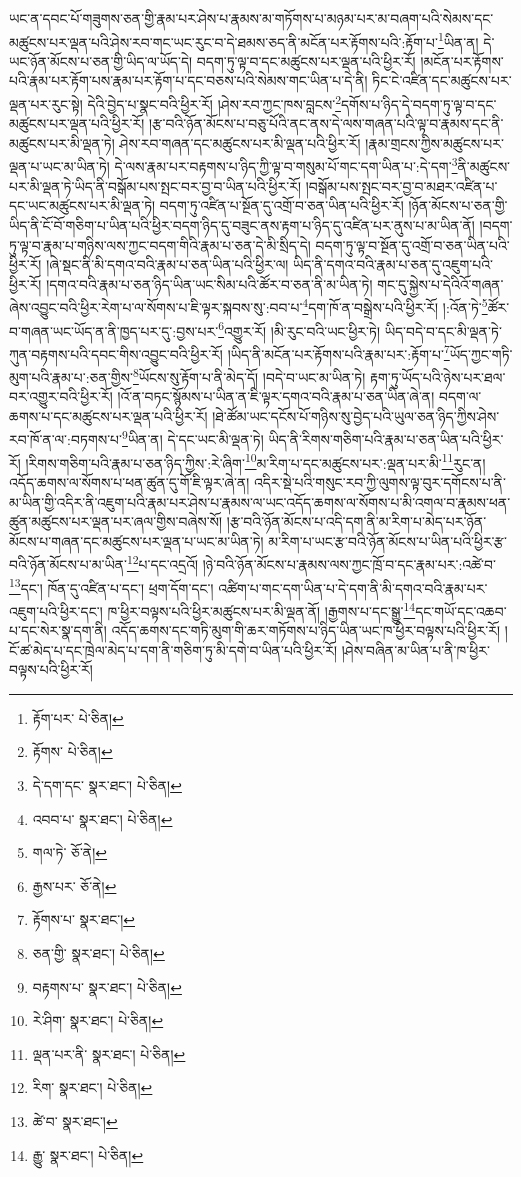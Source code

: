ཡང་ན་དབང་པོ་གཟུགས་ཅན་གྱི་རྣམ་པར་ཤེས་པ་རྣམས་མ་གཏོགས་པ་མཉམ་པར་མ་བཞག་པའི་སེམས་དང་མཚུངས་པར་ལྡན་པའི་ཤེས་རབ་གང་ཡང་རུང་བ་དེ་ཐམས་ཅད་ནི་མངོན་པར་རྟོགས་པའི་:རྟོག་པ་\footnote{རྟོག་པར་  པེ་ཅིན། }ཡིན་ན། དེ་ཡང་ཉོན་མོངས་པ་ཅན་གྱི་ཡིད་ལ་ཡོད་དེ། བདག་ཏུ་ལྟ་བ་དང་མཚུངས་པར་ལྡན་པའི་ཕྱིར་རོ། །མངོན་པར་རྟོགས་པའི་རྣམ་པར་རྟོག་པས་རྣམ་པར་རྟོག་པ་དང་བཅས་པའི་སེམས་གང་ཡིན་པ་དེ་ནི། ཏིང་ངེ་འཛིན་དང་མཚུངས་པར་ལྡན་པར་རུང་སྟེ། དེའི་བྱེད་པ་སྣང་བའི་ཕྱིར་རོ། །ཤེས་རབ་ཀྱང་ཁས་བླངས་\footnote{རྟོགས་  པེ་ཅིན། }དགོས་པ་ཉིད་དེ་བདག་ཏུ་ལྟ་བ་དང་མཚུངས་པར་ལྡན་པའི་ཕྱིར་རོ། །རྩ་བའི་ཉོན་མོངས་པ་བཅུ་པོའི་ནང་ནས་དེ་ལས་གཞན་པའི་ལྟ་བ་རྣམས་དང་ནི་མཚུངས་པར་མི་ལྡན་ཏེ། ཤེས་རབ་གཞན་དང་མཚུངས་པར་མི་ལྡན་པའི་ཕྱིར་རོ། །རྣམ་གྲངས་ཀྱིས་མཚུངས་པར་ལྡན་པ་ཡང་མ་ཡིན་ཏེ། དེ་ལས་རྣམ་པར་བརྟགས་པ་ཉིད་ཀྱི་ལྟ་བ་གསུམ་པོ་གང་དག་ཡིན་པ་:དེ་དག་\footnote{དེ་དག་དང་  སྣར་ཐང་།  པེ་ཅིན། }ནི་མཚུངས་པར་མི་ལྡན་ཏེ་ཡིད་ནི་བསྒོམ་པས་སྤང་བར་བྱ་བ་ཡིན་པའི་ཕྱིར་རོ། །བསྒོམ་པས་སྤང་བར་བྱ་བ་མཐར་འཛིན་པ་དང་ཡང་མཚུངས་པར་མི་ལྡན་ཏེ། བདག་ཏུ་འཛིན་པ་སྔོན་དུ་འགྲོ་བ་ཅན་ཡིན་པའི་ཕྱིར་རོ། །ཉོན་མོངས་པ་ཅན་གྱི་ཡིད་ནི་ངོ་བོ་གཅིག་པ་ཡིན་པའི་ཕྱིར་བདག་ཉིད་དུ་བཟུང་ནས་རྟག་པ་ཉིད་དུ་འཛིན་པར་ནུས་པ་མ་ཡིན་ནོ། །བདག་ཏུ་ལྟ་བ་རྣམ་པ་གཉིས་ལས་ཀྱང་བདག་གིའི་རྣམ་པ་ཅན་དེ་མི་སྲིད་དེ། བདག་ཏུ་ལྟ་བ་སྔོན་དུ་འགྲོ་བ་ཅན་ཡིན་པའི་ཕྱིར་རོ། །ཞེ་སྡང་ནི་མི་དགའ་བའི་རྣམ་པ་ཅན་ཡིན་པའི་ཕྱིར་ལ། ཡིད་ནི་དགའ་བའི་རྣམ་པ་ཅན་དུ་འཇུག་པའི་ཕྱིར་རོ། །དགའ་བའི་རྣམ་པ་ཅན་ཉིད་ཡིན་ཡང་སིམ་པའི་ཚོར་བ་ཅན་ནི་མ་ཡིན་ཏེ། གང་དུ་སྐྱེས་པ་དེའིའོ་གཞན་ཞེས་འབྱུང་བའི་ཕྱིར་རེག་པ་ལ་སོགས་པ་ཇི་ལྟར་སྐབས་སུ་:བབ་པ་\footnote{འབབ་པ་  སྣར་ཐང་།  པེ་ཅིན། }དག་ཁོ་ན་བསྒྲེས་པའི་ཕྱིར་རོ། །:འོན་ཏེ་\footnote{གལ་ཏེ་  ཅོ་ནེ། }ཚོར་བ་གཞན་ཡང་ཡོད་ན་ནི་ཁྱད་པར་དུ་:བྱས་པར་\footnote{རྒྱས་པར་  ཅོ་ནེ། }འགྱུར་རོ། །མི་རུང་བའི་ཡང་ཕྱིར་ཏེ། ཡིད་བདེ་བ་དང་མི་ལྡན་ཏེ་ཀུན་བརྟགས་པའི་དབང་གིས་འབྱུང་བའི་ཕྱིར་རོ། །ཡིད་ནི་མངོན་པར་རྟོགས་པའི་རྣམ་པར་:རྟོག་པ་\footnote{རྟོགས་པ་  སྣར་ཐང་། }ཡོད་ཀྱང་གཏི་མུག་པའི་རྣམ་པ་:ཅན་གྱིས་\footnote{ཅན་གྱི་  སྣར་ཐང་།  པེ་ཅིན། }ཡོངས་སུ་རྟོག་པ་ནི་མེད་དོ། །བདེ་བ་ཡང་མ་ཡིན་ཏེ། རྟག་ཏུ་ཡོད་པའི་ཉེས་པར་ཐལ་བར་འགྱུར་བའི་ཕྱིར་རོ། །འོ་ན་བཏང་སྙོམས་པ་ཡིན་ན་ཇི་ལྟར་དགའ་བའི་རྣམ་པ་ཅན་ཡིན་ཞེ་ན། བདག་ལ་ཆགས་པ་དང་མཚུངས་པར་ལྡན་པའི་ཕྱིར་རོ། །ཐེ་ཚོམ་ཡང་དངོས་པོ་གཉིས་སུ་བྱེད་པའི་ཡུལ་ཅན་ཉིད་ཀྱིས་ཤེས་རབ་ཁོ་ན་ལ་:བཏགས་པ་\footnote{བརྟགས་པ་  སྣར་ཐང་།  པེ་ཅིན། }ཡིན་ན། དེ་དང་ཡང་མི་ལྡན་ཏེ། ཡིད་ནི་རིགས་གཅིག་པའི་རྣམ་པ་ཅན་ཡིན་པའི་ཕྱིར་རོ། །རིགས་གཅིག་པའི་རྣམ་པ་ཅན་ཉིད་ཀྱིས་:རེ་ཞིག་\footnote{རེ་ཤིག་  སྣར་ཐང་།  པེ་ཅིན། }མ་རིག་པ་དང་མཚུངས་པར་:ལྡན་པར་མི་\footnote{ལྡན་པར་ནི་  སྣར་ཐང་།  པེ་ཅིན། }རུང་ན། འདོད་ཆགས་ལ་སོགས་པ་ཕན་ཚུན་དུ་གོ་ཇི་ལྟར་ཞེ་ན། འདིར་སྡེ་པའི་གསུང་རབ་ཀྱི་ལུགས་ལྟ་བུར་དགོངས་པ་ནི་མ་ཡིན་གྱི་འདིར་ནི་འཇུག་པའི་རྣམ་པར་ཤེས་པ་རྣམས་ལ་ཡང་འདོད་ཆགས་ལ་སོགས་པ་མི་འགལ་བ་རྣམས་ཕན་ཚུན་མཚུངས་པར་ལྡན་པར་ཞལ་གྱིས་བཞེས་སོ། །རྩ་བའི་ཉོན་མོངས་པ་འདི་དག་ནི་མ་རིག་པ་མེད་པར་ཉོན་མོངས་པ་གཞན་དང་མཚུངས་པར་ལྡན་པ་ཡང་མ་ཡིན་ཏེ། མ་རིག་པ་ཡང་རྩ་བའི་ཉོན་མོངས་པ་ཡིན་པའི་ཕྱིར་རྩ་བའི་ཉོན་མོངས་པ་མ་ཡིན་\footnote{རིག་  སྣར་ཐང་།  པེ་ཅིན། }པ་དང་འདྲའོ། །ཉེ་བའི་ཉོན་མོངས་པ་རྣམས་ལས་ཀྱང་ཁྲོ་བ་དང་རྣམ་པར་:འཚེ་བ་\footnote{ཚེ་བ་  སྣར་ཐང་། }དང་། ཁོན་དུ་འཛིན་པ་དང་། ཕྲག་དོག་དང་། འཚིག་པ་གང་དག་ཡིན་པ་དེ་དག་ནི་མི་དགའ་བའི་རྣམ་པར་འཇུག་པའི་ཕྱིར་དང་། ཁ་ཕྱིར་བལྟས་པའི་ཕྱིར་མཚུངས་པར་མི་ལྡན་ནོ། །རྒྱགས་པ་དང་སྒྱུ་\footnote{རྒྱུ་  སྣར་ཐང་།  པེ་ཅིན། }དང་གཡོ་དང་འཆབ་པ་དང་སེར་སྣ་དག་ནི། འདོད་ཆགས་དང་གཏི་མུག་གི་ཆར་གཏོགས་པ་ཉིད་ཡིན་ཡང་ཁ་ཕྱིར་བལྟས་པའི་ཕྱིར་རོ། །ངོ་ཚ་མེད་པ་དང་ཁྲེལ་མེད་པ་དག་ནི་གཅིག་ཏུ་མི་དགེ་བ་ཡིན་པའི་ཕྱིར་རོ། །ཤེས་བཞིན་མ་ཡིན་པ་ནི་ཁ་ཕྱིར་བལྟས་པའི་ཕྱིར་རོ། 